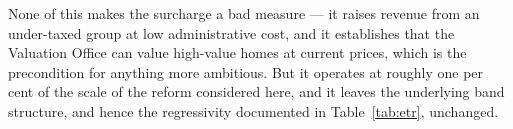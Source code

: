 None of this makes the surcharge a bad measure --- it raises revenue from an under-taxed group at low administrative cost, and it establishes that the Valuation Office can value high-value homes at current prices, which is the precondition for anything more ambitious. But it operates at roughly one per cent of the scale of the reform considered here, and it leaves the underlying band structure, and hence the regressivity documented in Table~\ref{tab:etr}, unchanged.
